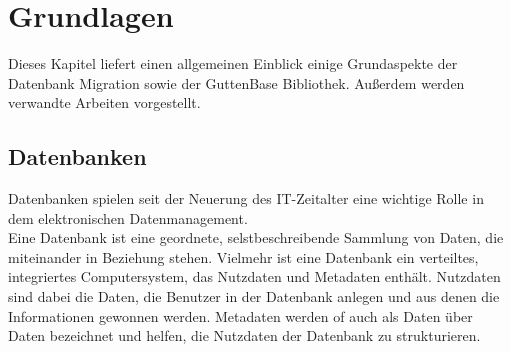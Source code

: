\chapter{Grundlagen}
Dieses Kapitel liefert einen allgemeinen Einblick einige Grundaspekte der Datenbank Migration sowie der GuttenBase Bibliothek. Außerdem werden verwandte Arbeiten vorgestellt. 
\section{Datenbanken}
Datenbanken spielen seit der Neuerung des IT-Zeitalter eine wichtige Rolle in dem elektronischen Datenmanagement.\\
Eine Datenbank ist eine geordnete, selstbeschreibende Sammlung von Daten, die miteinander in Beziehung stehen.
Vielmehr ist eine Datenbank ein verteiltes, integriertes Computersystem, das Nutzdaten und Metadaten enthält. Nutzdaten sind dabei die Daten, die Benutzer in der Datenbank anlegen und aus denen die Informationen gewonnen werden. Metadaten werden of auch als Daten über Daten bezeichnet und helfen, die Nutzdaten der Datenbank zu strukturieren. 
	
	
	
